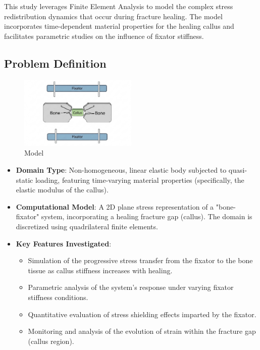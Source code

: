\documentclass{article}
\begin{document}
This study leverages Finite Element Analysis to model the complex stress redistribution dynamics that occur during fracture healing. The model incorporates time-dependent material properties for the healing callus and facilitates parametric studies on the influence of fixator stiffness.

\subsection{Problem Definition}

\begin{figure}[htbp]
  \centering
  \includegraphics[width=0.5\textwidth]{../assets/model_simulation.jpg}
  \caption{Model}
  \label{fig:model}
\end{figure}

\begin{itemize}
  \item \textbf{Domain Type}: Non-homogeneous, linear elastic body subjected to quasi-static loading, featuring time-varying material properties (specifically, the elastic modulus of the callus).
  \item \textbf{Computational Model}: A 2D plane stress representation of a "bone-fixator" system, incorporating a healing fracture gap (callus). The domain is discretized using quadrilateral finite elements.
  \item \textbf{Key Features Investigated}:
        \begin{itemize}
          \item Simulation of the progressive stress transfer from the fixator to the bone tissue as callus stiffness increases with healing.
          \item Parametric analysis of the system's response under varying fixator stiffness conditions.
          \item Quantitative evaluation of stress shielding effects imparted by the fixator.
          \item Monitoring and analysis of the evolution of strain within the fracture gap (callus region).
        \end{itemize}
\end{itemize}
\end{document}
